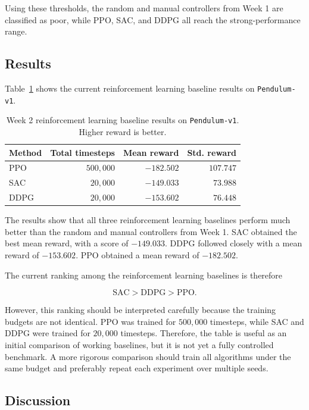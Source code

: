 \documentclass[11pt,a4paper]{article}
\begin{document}
Using these thresholds, the random and manual controllers from Week 1 are classified as poor, while PPO, SAC, and DDPG all reach the strong-performance range.

\subsection{Results}

Table~\ref{tab:week2_rl_results} shows the current reinforcement learning baseline results on \texttt{Pendulum-v1}.

\begin{table}[h]
\centering
\caption{Week 2 reinforcement learning baseline results on \texttt{Pendulum-v1}. Higher reward is better.}
\label{tab:week2_rl_results}
\begin{tabular}{|l|r|r|r|}
\hline
Method & Total timesteps & Mean reward & Std. reward \\
\hline
PPO & $500{,}000$ & $-182.502$ & $107.747$ \\
SAC & $20{,}000$ & $-149.033$ & $73.988$ \\
DDPG & $20{,}000$ & $-153.602$ & $76.448$ \\
\hline
\end{tabular}
\end{table}

The results show that all three reinforcement learning baselines perform much better than the random and manual controllers from Week 1. SAC obtained the best mean reward, with a score of $-149.033$. DDPG followed closely with a mean reward of $-153.602$. PPO obtained a mean reward of $-182.502$.

The current ranking among the reinforcement learning baselines is therefore

\[
\text{SAC} > \text{DDPG} > \text{PPO}.
\]

However, this ranking should be interpreted carefully because the training budgets are not identical. PPO was trained for $500{,}000$ timesteps, while SAC and DDPG were trained for $20{,}000$ timesteps. Therefore, the table is useful as an initial comparison of working baselines, but it is not yet a fully controlled benchmark. A more rigorous comparison should train all algorithms under the same budget and preferably repeat each experiment over multiple seeds.

\subsection{Discussion}
\end{document}

